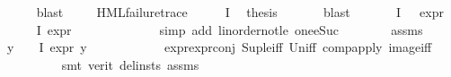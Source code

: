 \begin{isabellebody}
\ \ \ \ \isamarkupfalse%
\ blast\ \isanewline
\ \ \isamarkupfalse%
\ {\isacartoucheopen}HML{\isacharunderscore}{\kern0pt}failure{\isacharunderscore}{\kern0pt}trace\ {\isasympsi}{\isacartoucheclose}\ {\isacartoucheopen}{\isasympsi}\ {\isasymin}\ {\isasymPhi}\ {\isacharbackquote}{\kern0pt}\ I{\isacartoucheclose}\ \isamarkupfalse%
\ {\isacharquery}{\kern0pt}thesis\ \isanewline
\ \ \ \ \isamarkupfalse%
\ blast\isanewline
{}\isamarkupfalse%
\isanewline
\ \ \isamarkupfalse%
\ {\isachardoublequoteopen}{\isasymnot}\ {\isacharparenleft}{\kern0pt}{\isasymexists}{\isasympsi}{\isasymin}{\isasymPhi}\ {\isacharbackquote}{\kern0pt}\ I{\isachardot}{\kern0pt}\ {}\ {\isasymle}\ expr{\isacharunderscore}{\kern0pt}{}\ {\isasympsi}{\isacharparenright}{\kern0pt}{\isachardoublequoteclose}\isanewline
\ \ \isamarkupfalse%
\ {\isachardoublequoteopen}{\isasymforall}{\isasympsi}{\isasymin}{\isasymPhi}\ {\isacharbackquote}{\kern0pt}\ I{\isachardot}{\kern0pt}\ expr{\isacharunderscore}{\kern0pt}{}\ {\isasympsi}\ {\isasymle}\ {}{\isachardoublequoteclose}\isanewline
\ \ \ \ \isanewline
\ \ \ \ \isamarkupfalse%
\ {\isacharparenleft}{\kern0pt}simp\ add{\isacharcolon}{\kern0pt}\ linorder{\isacharunderscore}{\kern0pt}not{\isacharunderscore}{\kern0pt}le\ one{\isacharunderscore}{\kern0pt}eSuc{\isacharparenright}{\kern0pt}\isanewline
\ \ \ \ \ \ \isamarkupfalse%
\ assms{\isacharparenleft}{\kern0pt}{}{\isacharparenright}{\kern0pt}\ \isamarkupfalse%
\ {\isachardoublequoteopen}{\isacharparenleft}{\kern0pt}{\isasymforall}y\ {\isasymin}\ {\isacharparenleft}{\kern0pt}{\isasymPhi}\ {\isacharbackquote}{\kern0pt}\ I{\isacharparenright}{\kern0pt}{\isachardot}{\kern0pt}\ expr{\isacharunderscore}{\kern0pt}{}\ y\ {\isasymle}\ {}{\isacharparenright}{\kern0pt}{\isachardoublequoteclose}\isanewline
\ \ \ \ \ \ \ \ \isamarkupfalse%
\ expr{\isacharunderscore}{\kern0pt}{}{\isachardot}{\kern0pt}expr{\isacharunderscore}{\kern0pt}{}{\isacharunderscore}{\kern0pt}conj\ Sup{\isacharunderscore}{\kern0pt}le{\isacharunderscore}{\kern0pt}iff\ Un{\isacharunderscore}{\kern0pt}iff\ comp{\isacharunderscore}{\kern0pt}apply\ image{\isacharunderscore}{\kern0pt}iff\isanewline
\ \ \ \ \ \ \ \ \isamarkupfalse%
\ {\isacharparenleft}{\kern0pt}smt\ {\isacharparenleft}{\kern0pt}verit{\isacharcomma}{\kern0pt}\ del{\isacharunderscore}{\kern0pt}insts{\isacharparenright}{\kern0pt}\ assms{\isacharparenleft}{\kern0pt}{}{\isacharparenright}{\kern0pt}{\isacharparenright}{\kern0pt}\isanewline

\end{isabellebody}
